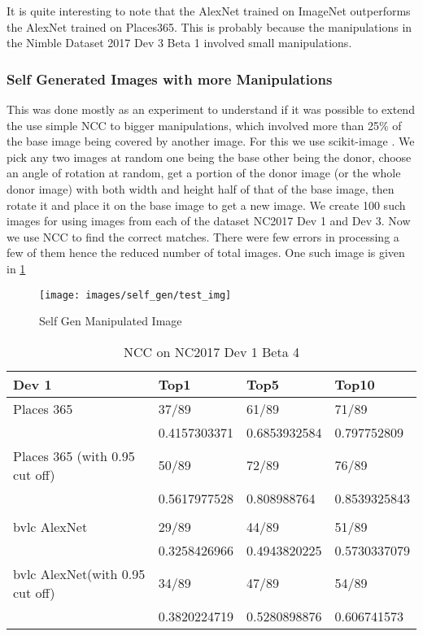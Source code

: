 \documentclass{article}
\begin{document}
It is quite interesting to note that the AlexNet trained on ImageNet outperforms the AlexNet trained on Places365. This is probably because the manipulations in the Nimble Dataset 2017 Dev 3 Beta 1 involved small manipulations.

\subsubsection{Self Generated Images with more Manipulations}
This was done mostly as an experiment to understand if it was possible to extend the use simple NCC to bigger manipulations, which involved more than 25\% of the base image being covered by another image. For this we use scikit-image \cite{scikit-image}. We pick any two images at random one being the base other being the donor, choose an angle of rotation at random, get a portion of the donor image (or the whole donor image) with both width and height half of that of the base image, then rotate it and place it on the base image to get a new image. We create 100 such images for using images from  each of the dataset NC2017 Dev 1 and Dev 3. Now we use NCC to find the correct matches. There were few errors in processing a few of them hence the reduced number of total images. One such image is given in \ref{fig:sg_img}

\begin{figure}[H]
  \centering
  \texttt{[image: images/self\_gen/test\_img]}
  \caption{Self Gen Manipulated Image}
  \label{fig:sg_img}
\end{figure}

\begin{table}[H]
\centering
\caption{NCC on NC2017 Dev 1 Beta 4}
\label{sg_dev1}
\begin{tabular}{|l|l|l|l|}
\hline
      Dev 1                         & Top1         & Top5         & Top10        \\ \hline
Places 365                     & 37/89        & 61/89        & 71/89        \\ \hline
                               & 0.4157303371 & 0.6853932584 & 0.797752809  \\ \hline
Places 365 (with 0.95 cut off) & 50/89        & 72/89        & 76/89        \\ \hline
                               & 0.5617977528 & 0.808988764  & 0.8539325843 \\ \hline
                               &              &              &              \\ \hline
bvlc AlexNet                           & 29/89        & 44/89        & 51/89        \\ \hline
                               & 0.3258426966 & 0.4943820225 & 0.5730337079 \\ \hline
bvlc AlexNet(with 0.95 cut off)       & 34/89        & 47/89        & 54/89        \\ \hline
                               & 0.3820224719 & 0.5280898876 & 0.606741573  \\ \hline
\end{tabular}
\end{table}
\end{document}
